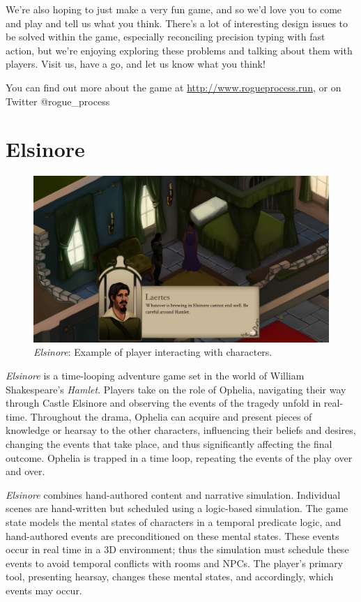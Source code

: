 \documentclass[letterpaper]{article}
\begin{document}
We're also hoping to just make a very fun game, and so we'd love you to come and play and tell us what you think.
There's a lot of interesting design issues to be solved within the game, especially reconciling precision typing with fast action, but we're enjoying exploring these problems and talking about them with players.
Visit us, have a go, and let us know what you think!

You can find out more about the game at \url{http://www.rogueprocess.run}, or on Twitter @rogue\_process


\section{Elsinore}

\begin{figure}[tbh]
  \centering
  \includegraphics[width=\columnwidth]{images/elsinore-screen}
  \caption{\textit{Elsinore}: Example of player interacting with characters.}
  \label{fig:el-setting}
\end{figure}

\textit{Elsinore} is a time-looping adventure game set in the world of William Shakespeare's \textit{Hamlet}.
Players take on the role of Ophelia, navigating their way through Castle Elsinore and observing the events of the tragedy unfold in real-time.
Throughout the drama, Ophelia can acquire and present pieces of knowledge or hearsay to the other characters, influencing their beliefs and desires, changing the events that take place, and thus significantly affecting the final outcome.
Ophelia is trapped in a time loop, repeating the events of the play over and over.

\textit{Elsinore} combines hand-authored content and narrative simulation.
Individual scenes are hand-written but scheduled using a logic-based simulation.
The game state models the mental states of characters in a temporal predicate logic, and hand-authored events are preconditioned on these mental states.
These events occur in real time in a 3D environment; thus the simulation must schedule these events to avoid temporal conflicts with rooms and NPCs.
The player's primary tool, presenting hearsay, changes these mental states, and accordingly, which events may occur.
\end{document}

